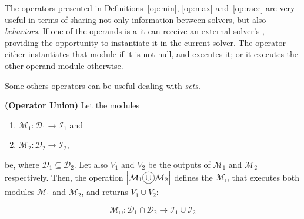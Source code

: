 %
%


The operators presented in Definitions~\ref{op:min}, \ref{op:max} and~\ref{op:race} are very useful in terms of sharing not only information between solvers, but also {\it behaviors}. If one of the operands is a \opch{} it can receive an external solver's \om{}, providing the opportunity to instantiate it in the current solver. The operator either instantiates that module if it is not null, and executes it; or it executes the other operand module otherwise.

Some others operators can be useful dealing with {\it sets}.

\begin{definition}\label{op:union}
{\bf (Operator Union)} Let the modules
\begin{enumerate}%
	\item $\mathcal{M}_1 : \mathcal{D}_1 \rightarrow \mathcal{I}_1$ and  
	\item $\mathcal{M}_2 : \mathcal{D}_2 \rightarrow \mathcal{I}_2$,
\end{enumerate}%
be, where $\mathcal{D}_1 \subseteq \mathcal{D}_2$. %
Let also $V_1$ and $V_2$ be the outputs of $\mathcal{M}_1$ and $\mathcal{M}_2$ respectively. Then, the operation $\left|\mathcal{M}_1\circled{$\cup$}\mathcal{M}_2\right|$ defines the \cm{} $\mathcal{M}_{\cup}$ that executes both modules $\mathcal{M}_1$ and $\mathcal{M}_2$, and returns $V_1\cup V_2$:

\[
\mathcal{M}_{\cup}:\mathcal{D}_1\cap\mathcal{D}_2 \rightarrow \mathcal{I}_1 \cup \mathcal{I}_2
\]
\end{definition}

